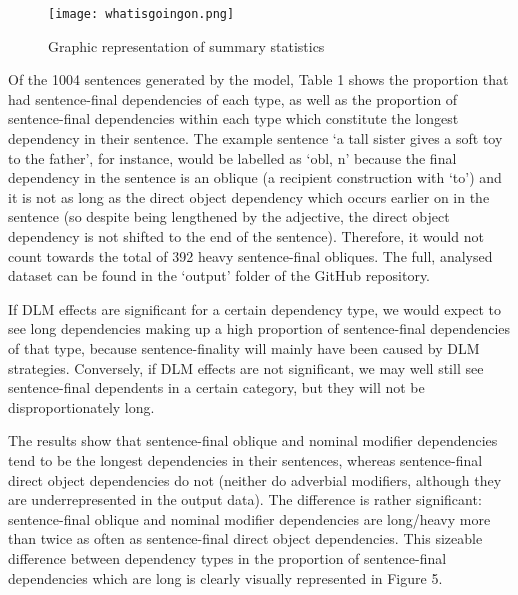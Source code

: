 \documentclass{article}
\begin{document}
\begin{figure}[H]
	\centering
	\texttt{[image: whatisgoingon.png]}
	\caption{Graphic representation of summary statistics}
	\label{fig:fig5}
\end{figure}

Of the 1004 sentences generated by the model, Table 1 shows the proportion that had sentence-final dependencies of each type, as well as the proportion of sentence-final dependencies within each type which constitute the longest dependency in their sentence. The example sentence `a tall sister gives a soft toy to the father', for instance, would be labelled as `obl, n' because the final dependency in the sentence is an oblique (a recipient construction with `to') and it is not as long as the direct object dependency which occurs earlier on in the sentence (so despite being lengthened by the adjective, the direct object dependency is not shifted to the end of the sentence). Therefore, it would not count towards the total of 392 heavy sentence-final obliques. The full, analysed dataset can be found in the `output' folder of the GitHub repository.  

If DLM effects are significant for a certain dependency type, we would expect to see long dependencies making up a high proportion of sentence-final dependencies of that type, because sentence-finality will mainly have been caused by DLM strategies. Conversely, if DLM effects are not significant, we may well still see sentence-final dependents in a certain category, but they will not be disproportionately long.

The results show that sentence-final oblique and nominal modifier dependencies tend to be the longest dependencies in their sentences, whereas sentence-final direct object dependencies do not (neither do adverbial modifiers, although they are underrepresented in the output data). The difference is rather significant: sentence-final oblique and nominal modifier dependencies are long/heavy more than twice as often as sentence-final direct object dependencies. This sizeable difference between dependency types in the proportion of sentence-final dependencies which are long is clearly visually represented in Figure 5.
\end{document}
